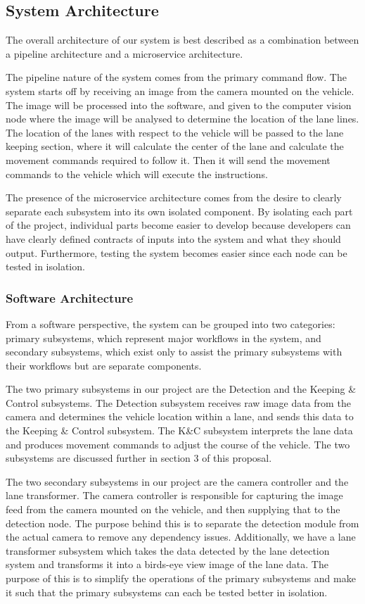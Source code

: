 \documentclass[titlepage]{article}
\begin{document}
\subsection{System Architecture}
The overall architecture of our system is best described as a combination between a pipeline architecture and a microservice architecture. 

The pipeline nature of the system comes from the primary command flow. The system starts off by receiving an image from the camera mounted on the vehicle. The image will be processed into the software, and given to the computer vision node where the image will be analysed to determine the location of the lane lines. The location of the lanes with respect to the vehicle will be passed to the lane keeping section, where it will calculate the center of the lane and calculate the movement commands required to follow it. Then it will send the movement commands to the vehicle which will execute the instructions. 

The presence of the microservice architecture comes from the desire to clearly separate each subsystem into its own isolated component. By isolating each part of the project, individual parts become easier to develop because developers can have clearly defined contracts of inputs into the system and what they should output. Furthermore, testing the system becomes easier since each node can be tested in isolation.

\subsubsection{Software Architecture}
From a software perspective, the system can be grouped into two categories: primary subsystems, which represent major workflows in the system, and secondary subsystems, which exist only to assist the primary subsystems with their workflows but are separate components.

The two primary subsystems in our project are the Detection and the Keeping \& Control subsystems. The Detection subsystem receives raw image data from the camera and determines the vehicle location within a lane, and sends this data to the Keeping \& Control subsystem. The K\&C subsystem interprets the lane data and produces movement commands to adjust the course of the vehicle. The two subsystems are discussed further in section 3 of this proposal.

The two secondary subsystems in our project are the camera controller and the lane transformer. The camera controller is responsible for capturing the image feed from the camera mounted on the vehicle, and then supplying that to the detection node. The purpose behind this is to separate the detection module from the actual camera to remove any dependency issues. Additionally, we have a lane transformer subsystem which takes the data detected by the lane detection system and transforms it into a birds-eye view image of the lane data. The purpose of this is to simplify the operations of the primary subsystems and make it such that the primary subsystems can each be tested better in isolation.
\end{document}
